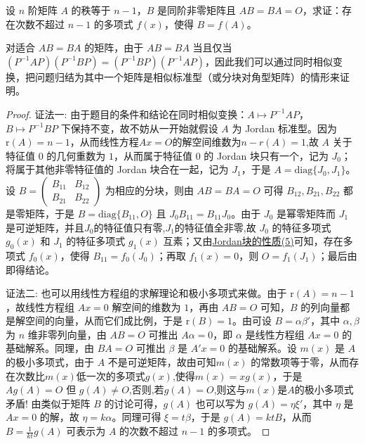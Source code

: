 \documentclass[../../main.tex]{subfiles}
\begin{document}
\begin{proposition}\label{proposition:与秩为n-1的矩阵乘法可交换的矩阵也可被其多项式表示}
设 $n$ 阶矩阵 $A$ 的秩等于 $n - 1$，$B$ 是同阶非零矩阵且 $AB = BA = O$，求证：存在次数不超过 $n - 1$ 的多项式 $f(x)$，使得 $B = f(A)$。
\end{proposition}
\begin{remark}
对适合 $AB = BA$ 的矩阵，由于 $AB = BA$ 当且仅当 $(P^{-1}AP)(P^{-1}BP)=(P^{-1}BP)(P^{-1}AP)$，因此我们可以通过同时相似变换，把问题归结为其中一个矩阵是相似标准型（或分块对角型矩阵）的情形来证明。
\end{remark}
\begin{proof}
{\color{blue}证法一:}
由于题目的条件和结论在同时相似变换：$A\mapsto P^{-1}AP$，$B\mapsto P^{-1}BP$ 下保持不变，故不妨从一开始就假设 $A$ 为 Jordan 标准型。因为 $\mathrm{r}(A)=n - 1$，从而线性方程$Ax=O$的解空间维数为$n-r(A)=1$,故 $A$ 关于特征值 $0$ 的几何重数为 $1$，从而属于特征值 $0$ 的 Jordan 块只有一个，记为 $J_0$；将属于其他非零特征值的 Jordan 块合在一起，记为 $J_1$，于是 $A = \mathrm{diag}\{J_0,J_1\}$。设 $B=\begin{pmatrix}
B_{11} & B_{12} \\
B_{21} & B_{22}
\end{pmatrix}$ 为相应的分块，则由 $AB = BA = O$ 可得 $B_{12},B_{21},B_{22}$ 都是零矩阵，于是 $B = \mathrm{diag}\{B_{11},O\}$ 且 $J_0B_{11}=B_{11}J_0$。由于 $J_0$ 是幂零矩阵而 $J_1$ 是可逆矩阵，并且$J_0$的特征值只有零,$J_1$的特征值全非零,故 $J_0$ 的特征多项式 $g_0(x)$ 和 $J_1$ 的特征多项式 $g_1(x)$ 互素；又由\hyperref[proposition:Jordan块的性质]{Jordan块的性质(5)}可知，存在多项式 $f_0(x)$，使得 $B_{11}=f_0(J_0)$；再取 $f_1(x)=0$，则 $O = f_1(J_1)$；最后由即得结论。

{\color{blue}证法二:}
也可以用线性方程组的求解理论和极小多项式来做。由于 $\mathrm{r}(A)=n - 1$，故线性方程组 $Ax = 0$ 解空间的维数为 $1$，再由 $AB = O$ 可知，$B$ 的列向量都是解空间的向量，从而它们成比例，于是 $\mathrm{r}(B)=1$。由可设 $B = \alpha\beta'$，其中 $\alpha,\beta$ 为 $n$ 维非零列向量，由 $AB = O$ 可推出 $A\alpha = 0$，即 $\alpha$ 是线性方程组 $Ax = 0$ 的基础解系。同理，由 $BA = O$ 可推出 $\beta$ 是 $A'x = 0$ 的基础解系。设 $m(x)$ 是 $A$ 的极小多项式，由于 $A$ 不是可逆矩阵，故由可知$m(x)$ 的常数项等于零，从而存在次数比$m(x)$低一次的多项式$g(x)$,使得$m(x)=xg(x)$，于是 $Ag(A)=O$ 但 $g(A)\neq O$,否则,若$g(A)=O$,则这与$m(x)$是$A$的极小多项式矛盾! 由类似于矩阵 $B$ 的讨论可得，$g(A)$ 也可以写为 $g(A)=\eta\xi'$，其中 $\eta$ 是 $Ax = 0$ 的解，故 $\eta = k\alpha$。同理可得 $\xi = t\beta$，于是 $g(A)=ktB$，从而 $B = \frac{1}{kt}g(A)$ 可表示为 $A$ 的次数不超过 $n - 1$ 的多项式。
\end{proof}
\end{document}
